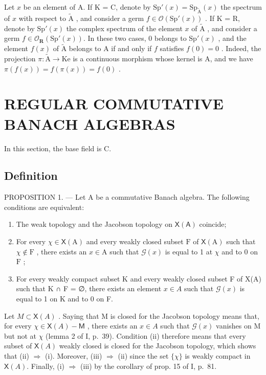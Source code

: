 Let \(x\) be an element of A. If K = C, denote by \(\mathrm{Sp}'(x) = \mathrm{Sp}_{\widetilde{\mathrm{A}}} (x)\) the spectrum of \(x\) with respect to \(\widetilde{\mathrm{A}}\) , and consider a germ \(f \in \mathcal{O}(\mathrm{Sp}'(x))\) . If K = R, denote by \(\mathrm{Sp}'(x)\) the complex spectrum of the element \(x\) of \(\widetilde{\mathrm{A}}\) , and consider a germ \(f \in \mathcal{O}_{\mathbf{R}}(\mathrm{Sp}'(x))\). In these two cases, 0 belongs to \(\mathrm{Sp}'(x)\) , and the element \(f(x)\) of \(\widetilde{\mathrm{A}}\) belongs to A if and only if \(f\) satisfies \(f(0) = 0\) . Indeed, the projection \(\pi: \widetilde{\mathrm{A}} \to \mathrm{Ke}\) is a continuous morphism whose kernel is A, and we have \(\pi(f(x)) = f(\pi(x)) = f(0)\) .

\section{REGULAR COMMUTATIVE BANACH ALGEBRAS}

In this section, the base field is C.

\subsection{Definition}

PROPOSITION 1. --- Let A be a commutative Banach algebra. The following conditions are equivalent:

\begin{enumerate}
\def\labelenumi{(\roman{enumi})}
\item
  The weak topology and the Jacobson topology on \(\mathsf{X}(\mathsf{A})\) coincide;
\item
  For every \(\chi \in \mathsf{X}(\mathrm{A})\) and every weakly closed subset \(\mathrm{F}\) of \(\mathsf{X}(\mathrm{A})\) such that \(\chi \notin \mathrm{F}\) , there exists an \(x \in \mathrm{A}\) such that \(\mathcal{G}(x)\) is equal to 1 at \(\chi\) and to 0 on \(\mathrm{F}\) ;
\item
  For every weakly compact subset K and every weakly closed subset F of X(A) such that K ∩ F = ∅, there exists an element \(x \in A\) such that \(\mathcal{G}(x)\) is equal to 1 on K and to 0 on F.
\end{enumerate}

Let \(M \subset \mathsf{X}(A)\) . Saying that M is closed for the Jacobson topology means that, for every \(\chi \in \mathsf{X}(A) - \mathsf{M}\) , there exists an \(x \in A\) such that \(\mathcal{G}(x)\) vanishes on M but not at \(\chi\) (lemma 2 of I, p.~39). Condition (ii) therefore means that every subset of \(\mathsf{X}(A)\) weakly closed is closed for the Jacobson topology, which shows that (ii) \(\Longrightarrow\) (i). Moreover, (iii) \(\Longrightarrow\) (ii) since the set \(\{\chi\}\) is weakly compact in \(\mathsf{X}(A)\). Finally, (i) \(\Longrightarrow\) (iii) by the corollary of prop. 15 of I, p.~81.

